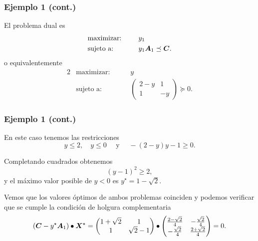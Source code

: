 \documentclass[aspectratio=169,12pt,spanish]{beamer}
\begin{document}
\begin{frame}
\frametitle{Ejemplo 1 (cont.)}

El problema dual es
\begin{alignat*}{2}
  & \text{maximizar: }  & \quad & y_1   \\
   & \text{sujeto a: } & \quad & y_1 \bm{A}_1 \preceq \bm{C}.
\end{alignat*}
o equivalentemente
\begin{alignat*}{2}
  & \text{maximizar: }  & \quad & y   \\
   & \text{sujeto a: } & \quad & \begin{pmatrix}
2 - y & 1 \\ 1 & -y \end{pmatrix} \succeq 0.
\end{alignat*}

\end{frame}


\begin{frame}
\frametitle{Ejemplo 1 (cont.)}

En este caso tenemos las restricciones
$$y \le 2, \quad y \le 0 \quad \text{ y } \quad -(2-y)y - 1 \ge 0.$$

Completando cuadrados obtenemos
$$
(y-1)^2 \ge 2,
$$
y el máximo valor posible de $y < 0$ es $y^\star = 1 - \sqrt{2}$.

Vemos que los valores óptimos de ambos problemas coinciden y podemos verificar que se cumple la condición de holgura complementaria
$$
(\bm{C} - y^\star \bm{A}_1 ) \bullet \bm{X}^\star = 
\begin{pmatrix}
1 + \sqrt{2} & 1 \\ 1 & \sqrt{2} - 1
\end{pmatrix} \bullet \begin{pmatrix}
\frac{2 - \sqrt{2}}{4} & -\frac{\sqrt{2}}{4} \\
-\frac{\sqrt{2}}{4} & \frac{2 + \sqrt{2}}{4}
\end{pmatrix} = 0.
$$

\end{frame}

\end{document}
